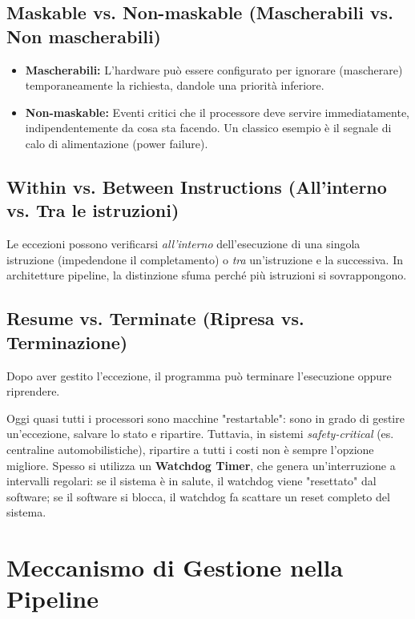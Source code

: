 \subsection{Maskable vs. Non-maskable (Mascherabili vs. Non mascherabili)}
\begin{itemize}
    \item \textbf{Mascherabili:} L'hardware può essere configurato per ignorare (mascherare) temporaneamente la richiesta, dandole una priorità inferiore.
    \item \textbf{Non-maskable:} Eventi critici che il processore deve servire immediatamente, indipendentemente da cosa sta facendo. Un classico esempio è il segnale di calo di alimentazione (power failure).
\end{itemize}

\subsection{Within vs. Between Instructions (All'interno vs. Tra le istruzioni)}
Le eccezioni possono verificarsi \textit{all'interno} dell'esecuzione di una singola istruzione (impedendone il completamento) o \textit{tra} un'istruzione e la successiva. In architetture pipeline, la distinzione sfuma perché più istruzioni si sovrappongono.

\subsection{Resume vs. Terminate (Ripresa vs. Terminazione)}
Dopo aver gestito l'eccezione, il programma può terminare l'esecuzione oppure riprendere.
\begin{remark}
Oggi quasi tutti i processori sono macchine "restartable": sono in grado di gestire un'eccezione, salvare lo stato e ripartire. Tuttavia, in sistemi \textit{safety-critical} (es. centraline automobilistiche), ripartire a tutti i costi non è sempre l'opzione migliore. Spesso si utilizza un \textbf{Watchdog Timer}, che genera un'interruzione a intervalli regolari: se il sistema è in salute, il watchdog viene "resettato" dal software; se il software si blocca, il watchdog fa scattare un reset completo del sistema.
\end{remark}

\section{Meccanismo di Gestione nella Pipeline}

